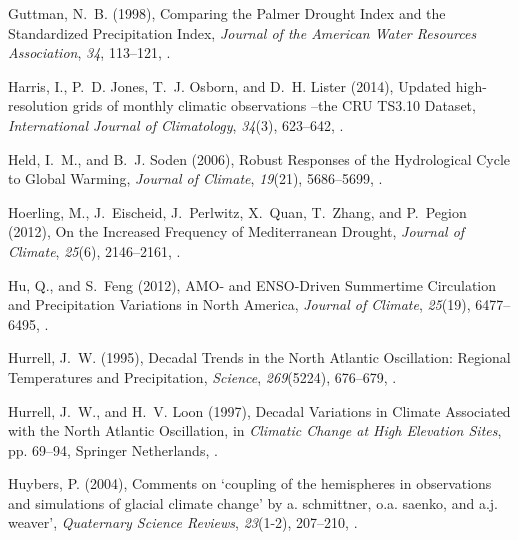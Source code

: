 \documentclass[draft,jgr]{AGUTeX}
\begin{document}
\begin{article}
\begin{thebibliography}{74}
Guttman, N.~B. (1998), {Comparing the Palmer Drought Index and the Standardized
  Precipitation Index}, \textit{Journal of the American Water Resources
  Association}, \textit{34}, 113--121,
  .

Harris, I., P.~D. Jones, T.~J. Osborn, and D.~H. Lister (2014), {Updated
  high-resolution grids of monthly climatic observations --the CRU TS3.10
  Dataset}, \textit{International Journal of Climatology}, \textit{34}(3),
  623--642, .

Held, I.~M., and B.~J. Soden (2006), {Robust Responses of the Hydrological
  Cycle to Global Warming}, \textit{Journal of Climate}, \textit{19}(21),
  5686--5699, .

Hoerling, M., J.~Eischeid, J.~Perlwitz, X.~Quan, T.~Zhang, and P.~Pegion
  (2012), {On the Increased Frequency of Mediterranean Drought},
  \textit{Journal of Climate}, \textit{25}(6), 2146--2161,
  .

Hu, Q., and S.~Feng (2012), {AMO- and ENSO-Driven Summertime Circulation and
  Precipitation Variations in North America}, \textit{Journal of Climate},
  \textit{25}(19), 6477--6495, .

Hurrell, J.~W. (1995), {Decadal Trends in the North Atlantic Oscillation:
  Regional Temperatures and Precipitation}, \textit{Science},
  \textit{269}(5224), 676--679, .

Hurrell, J.~W., and H.~V. Loon (1997), {Decadal Variations in Climate
  Associated with the North Atlantic Oscillation}, in \textit{Climatic Change
  at High Elevation Sites}, pp. 69--94, Springer Netherlands,
  .

Huybers, P. (2004), Comments on `coupling of the hemispheres in observations
  and simulations of glacial climate change' by a. schmittner, o.a. saenko, and
  a.j. weaver', \textit{Quaternary Science Reviews}, \textit{23}(1-2),
  207--210, .


\end{thebibliography}
\end{article}
\end{document}
